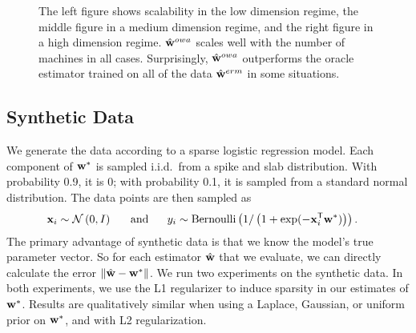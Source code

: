 \documentclass[thesis.tex]{subfiles}
\begin{document}
\begin{figure*}[t]
\caption{
    The left figure shows scalability in the low dimension regime,
    the middle figure in a medium dimension regime,
    and the right figure in a high dimension regime.
    $\hat{\mathbf w}^{owa}$ scales well with the number of machines in all cases.
    Surprisingly, $\hat{\mathbf w}^{owa}$ outperforms the oracle estimator trained on all of the data $\hat{\mathbf w}^{erm}$ in some situations.
    \vspace{-0.1in}
    }
\label{fig:synscale}
\end{figure*}


\vspace{-0.1in}
\subsection{Synthetic Data}

\vspace{-0.05in}
We generate the data according to a sparse logistic regression model.
Each component of ${\mathbf w^{*}}$ is sampled i.i.d.\ from a spike and slab distribution.
With probability 0.9, it is 0;
with probability 0.1, it is sampled from a standard normal distribution.
The data points are then sampled as
\begin{equation}
\begin{aligned}
\mathbf{x}_i &\sim \mathcal{N}\left({{0}},{{I}}\right)
    \text{~~~~~and~~~~~}
y_i \sim \text{Bernoulli}\left(1/\left(1+\exp(-{\mathbf{x}}^{\mathsf{T}}_i{\mathbf w^{*}})\right)\right)
.
\end{aligned}
\end{equation}
The primary advantage of synthetic data is that we know the model's true parameter vector.
So for each estimator ${\hat{\mathbf w}}$ that we evaluate, we can directly calculate the error ${\lVert {{\hat{\mathbf w}}-{\mathbf w^{*}}} \rVert}$.
We run two experiments on the synthetic data.
In both experiments, we use the L1 regularizer to induce sparsity in our estimates of ${\mathbf w^{*}}$.
Results are qualitatively similar when using a Laplace, Gaussian, or uniform prior on ${\mathbf w^{*}}$, and with L2 regularization.
\end{document}
